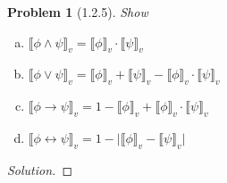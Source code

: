 \documentclass[letter]{article}
\newtheorem{problem}{Problem}
\theoremstyle{definition}
\newenvironment{solution}
{\begin{proof}[Solution]}
	{\end{proof}}
\begin{document}
 
\newcommand{\den}[1]{\llbracket #1 \rrbracket_v}
\begin{problem}[1.2.5]
    Show
 \begin{enumerate}[(a)]
     \item $\den{\phi \land \psi} = \den{\phi} \cdot \den{\psi}$
     \item $\den{\phi \lor \psi} = \den{\phi} + \den{\psi} - \den{\phi} \cdot \den\psi$
     \item $\den{\phi \to \psi} = 1 - \den{\phi} + \den{\phi} \cdot \den{\psi}$
     \item $\den{\phi \leftrightarrow \psi} = 1 - \big|
     \den{\phi} - \den{\psi} \big|$
 \end{enumerate}
\end{problem}
\begin{solution}
    
\end{solution}
\end{document}
